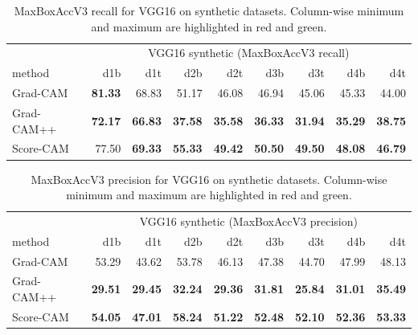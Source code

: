 \begin{table}[ht]
\centering
\begin{tabular}{lrrrrrrrr}
\toprule
 & \multicolumn{8}{c}{VGG16 synthetic (MaxBoxAccV3 recall)} \\
method & d1b & d1t & d2b & d2t & d3b & d3t & d4b & d4t \\
\cmidrule(lr){1-1} \cmidrule(lr){2-9} 
Grad-CAM & \color{teal} \bfseries 81.33 & 68.83 & 51.17 & 46.08 & 46.94 & 45.06 & 45.33 & 44.00 \\
Grad-CAM++ & \color{purple} \bfseries 72.17 & \color{purple} \bfseries 66.83 & \color{purple} \bfseries 37.58 & \color{purple} \bfseries 35.58 & \color{purple} \bfseries 36.33 & \color{purple} \bfseries 31.94 & \color{purple} \bfseries 35.29 & \color{purple} \bfseries 38.75 \\
Score-CAM & 77.50 & \color{teal} \bfseries 69.33 & \color{teal} \bfseries 55.33 & \color{teal} \bfseries 49.42 & \color{teal} \bfseries 50.50 & \color{teal} \bfseries 49.50 & \color{teal} \bfseries 48.08 & \color{teal} \bfseries 46.79 \\
\bottomrule
\end{tabular}
\caption[MaxBoxAccV3 recall for VGG16 on synthetic datasets]{MaxBoxAccV3 recall for VGG16 on synthetic datasets. Column-wise minimum and maximum are highlighted in red and green.}
\label{tab:maxboxaccv3_recall_vgg16_base_synthetic}
\end{table}

\begin{table}[ht]
\centering
\begin{tabular}{lrrrrrrrr}
\toprule
 & \multicolumn{8}{c}{VGG16 synthetic (MaxBoxAccV3 precision)} \\
method & d1b & d1t & d2b & d2t & d3b & d3t & d4b & d4t \\
\cmidrule(lr){1-1} \cmidrule(lr){2-9}
Grad-CAM & 53.29 & 43.62 & 53.78 & 46.13 & 47.38 & 44.70 & 47.99 & 48.13 \\
Grad-CAM++ & \color{purple} \bfseries 29.51 & \color{purple} \bfseries 29.45 & \color{purple} \bfseries 32.24 & \color{purple} \bfseries 29.36 & \color{purple} \bfseries 31.81 & \color{purple} \bfseries 25.84 & \color{purple} \bfseries 31.01 & \color{purple} \bfseries 35.49 \\
Score-CAM & \color{teal} \bfseries 54.05 & \color{teal} \bfseries 47.01 & \color{teal} \bfseries 58.24 & \color{teal} \bfseries 51.22 & \color{teal} \bfseries 52.48 & \color{teal} \bfseries 52.10 & \color{teal} \bfseries 52.36 & \color{teal} \bfseries 53.33 \\
\bottomrule
\end{tabular}
\caption[MaxBoxAccV3 precision for VGG16 on synthetic datasets]{MaxBoxAccV3 precision for VGG16 on synthetic datasets. Column-wise minimum and maximum are highlighted in red and green.}
\label{tab:maxboxaccv3_precision_vgg16_base_synthetic}
\end{table}

